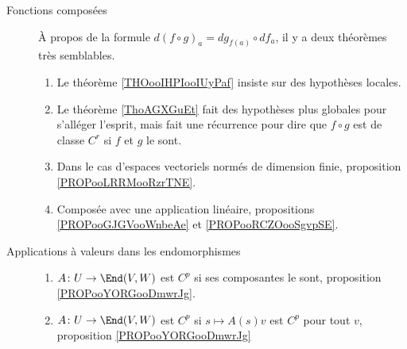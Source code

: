 \begin{description}
	\item[Fonctions composées]
		À propos de la formule \( d(f\circ g)_a=dg_{f(a)}\circ df_a\), il y a deux théorèmes très semblables.
		\begin{enumerate}
			\item
			      Le théorème \ref{THOooIHPIooIUyPaf} insiste sur des hypothèses locales.
			\item
			      Le théorème \ref{ThoAGXGuEt} fait des hypothèses plus globales pour s'alléger l'esprit, mais fait une récurrence pour dire que \( f\circ g\) est de classe \( C^r\) si \( f\) et \( g\) le sont.
			\item
			      Dans le cas d'espaces vectoriels normés de dimension finie, proposition \ref{PROPooLRRMooRzrTNE}.
			\item
			      Composée avec une application linéaire, propositions \ref{PROPooGJGVooWnbeAe} et \ref{PROPooRCZOooSgvpSE}.
		\end{enumerate}
	\item[Applications à valeurs dans les endomorphismes]
		\begin{enumerate}
			\item
			      \(A \colon U\to \End(V,W)  \) est \( C^p\) si ses composantes le sont, proposition \ref{PROPooYORGooDmwrJg}.
			\item
			      \(A \colon U\to \End(V,W)  \) est \( C^p\) si \( s\mapsto A(s)v\) est \( C^p\) pour tout \( v\), proposition \ref{PROPooYORGooDmwrJg}
		\end{enumerate}
\end{description}

